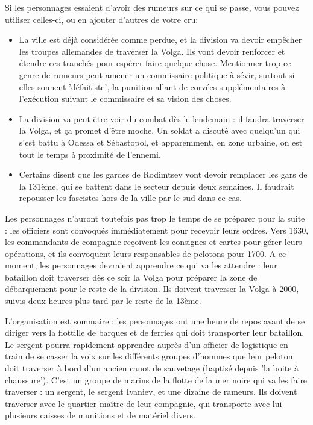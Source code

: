 \documentclass{report}
\begin{document}
\begin{multicols}{2}
Si les personnages essaient d'avoir des rumeurs sur ce qui se passe, vous pouvez utiliser celles-ci, ou en ajouter d'autres de votre cru:
\begin{itemize}
    \item La ville est déjà considérée comme perdue, et la division va devoir empêcher les troupes allemandes de traverser la Volga. Ils vont devoir renforcer et étendre ces tranchés pour espérer faire quelque chose. Mentionner trop ce genre de rumeurs peut amener un commissaire politique à sévir, surtout si elles sonnent 'défaitiste', la punition allant de corvées supplémentaires à l'exécution suivant le commissaire et sa vision des choses.
    \item La division va peut-être voir du combat dès le lendemain : il faudra traverser la Volga, et ça promet d'être moche. Un soldat a discuté avec quelqu'un qui s'est battu à Odessa et Sébastopol, et apparemment, en zone urbaine, on est tout le temps à proximité de l'ennemi.
    \item Certains disent que les gardes de Rodimtsev vont devoir remplacer les gars de la 131ème, qui se battent dans le secteur depuis deux semaines. Il faudrait repousser les fascistes hors de la ville par le sud dans ce cas.
\end{itemize}

Les personnages n'auront toutefois pas trop le temps de se préparer pour la suite : les officiers sont convoqués immédiatement pour recevoir leurs ordres. Vers 1630, les commandants de compagnie reçoivent les consignes et cartes pour gérer leurs opérations, et ils convoquent leurs responsables de pelotons pour 1700. A ce moment, les personnages devraient apprendre ce qui va les attendre : leur bataillon doit traverser dès ce soir la Volga pour préparer la zone de débarquement pour le reste de la division. Ils doivent traverser la Volga à 2000, suivis deux heures plus tard par le reste de la 13ème.

L'organisation est sommaire : les personnages ont une heure de repos avant de se diriger vers la flottille de barques et de ferries qui doit transporter leur bataillon. Le sergent pourra rapidement apprendre auprès d'un officier de logistique en train de se casser la voix sur les différents groupes d'hommes que leur peloton doit traverser à bord d'un ancien canot de sauvetage (baptisé depuis 'la boite à chaussure'). C'est un groupe de marins de la flotte de la mer noire qui va les faire traverser : un sergent, le sergent Ivaniev, et une dizaine de rameurs. Ils doivent traverser avec le quartier-maître de leur compagnie, qui transporte avec lui plusieurs caisses de munitions et de matériel divers.


\end{multicols}
\end{document}
